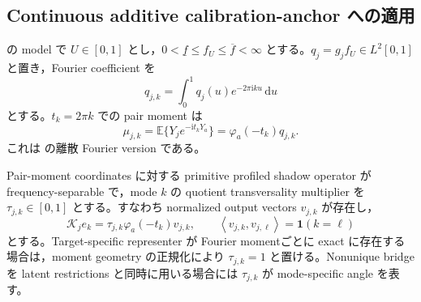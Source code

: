 \documentclass[11pt,a4paper]{ltjsarticle}
\theoremstyle{remark}
\newcommand{\E}{\mathbb E}
\newcommand{\one}{\bm 1}
\newcommand{\dd}{\,\mathrm d}
\newcommand{\ii}{\mathrm i}
\newcommand{\inner}[2]{\left\langle#1,#2\right\rangle}
\newcommand{\Kop}{\mathscr K}
\begin{document}
\subsection{Continuous additive calibration-anchor への適用}

の model で $U\in[0,1]$ とし，$0<\underline f\le f_U\le\overline f<\infty$ とする。$q_j=g_jf_U\in L^2[0,1]$ と置き，Fourier coefficient を
\[
q_{j,k}=\int_0^1q_j(u)e^{-2\pi\ii ku}\dd u
\]
とする。$t_k=2\pi k$ での pair moment は
\begin{equation}
\mu_{j,k}
=\E\{Y_je^{-\ii t_kY_a}\}
=\varphi_a(-t_k)q_{j,k}.
\label{eq:additivefouriermoment}
\end{equation}
これは  の離散 Fourier version である。

Pair-moment coordinates に対する primitive profiled shadow operator が frequency-separable で，mode $k$ の quotient transversality multiplier を $\tau_{j,k}\in[0,1]$ とする。すなわち normalized output vectors $v_{j,k}$ が存在し，
\begin{equation}
\Kop_j e_k
=\tau_{j,k}\varphi_a(-t_k)v_{j,k},
\qquad
\inner{v_{j,k}}{v_{j,\ell}}=\one(k=\ell)
\label{eq:additiveeffectivemode}
\end{equation}
とする。Target-specific representer が Fourier momentごとに exact に存在する場合は，moment geometry の正規化により $\tau_{j,k}=1$ と置ける。Nonunique bridge を latent restrictions と同時に用いる場合には $\tau_{j,k}$ が mode-specific angle を表す。
\end{document}
